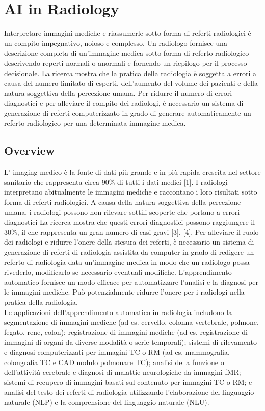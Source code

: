 \documentclass[12pt,a4paper]{report}
\begin{document}
\chapter{AI in Radiology}
Interpretare immagini mediche e riassumerle sotto forma di referti radiologici è un compito impegnativo, noioso e complesso. Un radiologo fornisce una descrizione completa di un'immagine medica sotto forma di referto radiologico descrivendo reperti normali o anormali e fornendo un riepilogo per il processo decisionale. La ricerca mostra che la pratica della radiologia è soggetta a errori a causa del numero limitato di esperti, dell'aumento del volume dei pazienti e della natura soggettiva della percezione umana. Per ridurre il numero di errori diagnostici e per alleviare il compito dei radiologi, è necessario un sistema di generazione di referti computerizzato in grado di generare automaticamente un referto radiologico per una determinata immagine medica.

\section{Overview}
L’ imaging medico è la fonte di dati più grande e in più rapida crescita nel settore sanitario che rappresenta circa 90\% di tutti i dati medici [1]. 
I radiologi interpretano abitualmente le immagini mediche e raccontano i loro risultati sotto forma di referti radiologici. A causa della natura soggettiva della percezione umana, i radiologi possono non rilevare sottili scoperte che portano a errori diagnostici La ricerca mostra che questi errori diagnostici possono raggiungere il 30\%, il che rappresenta un gran numero di casi gravi [3], [4].
Per alleviare il ruolo dei radiologi e ridurre l'onere della stesura dei referti, è necessario un sistema di generazione di referti di radiologia assistita da computer in grado di redigere un referto di radiologia data un'immagine medica in modo che un radiologo possa rivederlo, modificarlo se necessario eventuali modifiche.
L'apprendimento automatico fornisce un modo efficace per automatizzare l'analisi e la diagnosi per le immagini mediche. Può potenzialmente ridurre l'onere per i radiologi nella pratica della radiologia.\\
Le applicazioni dell'apprendimento automatico in radiologia includono la segmentazione di immagini mediche (ad es. cervello, colonna vertebrale, polmone, fegato, rene, colon); registrazione di immagini mediche (ad es. registrazione di immagini di organi da diverse modalità o serie temporali); sistemi di rilevamento e diagnosi computerizzati per immagini TC o RM (ad es. mammografia, colongrafia TC e CAD nodulo polmonare TC); analisi della funzione o dell'attività cerebrale e diagnosi di malattie neurologiche da immagini fMR; sistemi di recupero di immagini basati sul contenuto per immagini TC o RM; e analisi del testo dei referti di radiologia utilizzando l'elaborazione del linguaggio naturale (NLP) e la comprensione del linguaggio naturale (NLU).
\end{document}
